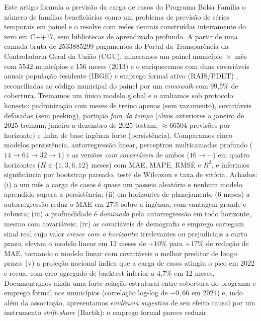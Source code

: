 \documentclass[12pt,a4paper,oneside]{article}
\begin{document}
\noindent
Este artigo formula a previsão da carga de casos do Programa Bolsa
Família \textemdash{} o número de famílias beneficiárias \textemdash{}
como um problema de previsão de séries temporais em painel e o resolve
com redes neurais construídas inteiramente do zero em C++17, sem
bibliotecas de aprendizado profundo. A partir de uma camada bruta de
\num{2533885299} pagamentos do Portal da Transparência da
Controladoria-Geral da União (CGU), mineramos um painel
município~$\times$~mês com \num{5542} municípios e 156 meses
(2013) e o enriquecemos com duas covariáveis anuais
\textemdash{} população residente (IBGE) e emprego formal ativo
(RAIS/PDET) \textemdash{}, reconciliadas ao código municipal do painel por
um \emph{crosswalk} com 99,5\% de cobertura. Treinamos um único modelo
global e o avaliamos sob protocolo honesto: padronização com meses de
treino apenas (sem vazamento), covariáveis defasadas (sem peeking),
partição \emph{fora do tempo} (alvos anteriores a janeiro de 2025
treinam; janeiro a dezembro de 2025 testam, $\approx$\num{66504} previsões
por horizonte) e linha de base ingênua forte (persistência). Comparamos
cinco modelos \textemdash{} persistência, autorregressão linear,
perceptron multicamadas profundo ($14\to 64\to 32\to 1$) e as versões
\emph{com covariáveis} de ambos ($16\to\cdots$) \textemdash{} em quatro
horizontes ($H\in\{1,3,6,12\}$ meses) com MAE, MAPE, RMSE e $R^2$, e
inferimos significância por bootstrap pareado, teste de Wilcoxon e taxa de
vitória. Achados: (i) a um mês a carga de casos é quase um passeio
aleatório e nenhum modelo aprendido supera a persistência; (ii) em
horizontes de planejamento (6 meses) a autorregressão reduz o MAE em
27\% sobre a ingênua, com vantagem grande e robusta; (iii) a profundidade
é \emph{dominada} pela autorregressão em todo horizonte, mesmo com
covariáveis; (iv) as covariáveis de demografia e emprego carregam sinal
real cujo valor \emph{cresce com o horizonte}: irrelevantes ou prejudiciais
a curto prazo, elevam o modelo linear em 12 meses de $+10\%$ para
$+17\%$ de redução de MAE, tornando o modelo linear com covariáveis o
melhor preditor de longo prazo; (v) a projeção nacional indica que a carga
de casos atingiu o pico em 2022 e recua, com erro agregado
de backtest inferior a 4,7\% em 12 meses. Documentamos ainda uma forte
relação estrutural entre cobertura do programa e emprego formal nos
municípios (correlação log-log de $-0{,}66$ em 2024) e, indo além da
associação, apresentamos \emph{evidência sugestiva} de seu efeito causal por
um instrumento \emph{shift-share} (Bartik): o emprego formal parece reduzir
\end{document}
